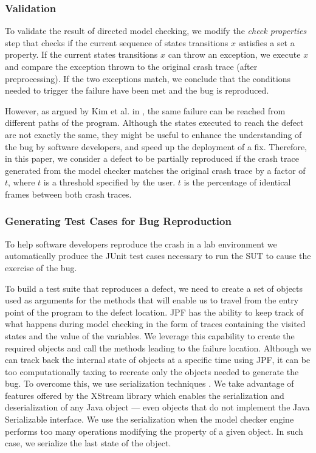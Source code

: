 \subsubsection{Validation}

To validate the result of directed model checking, we modify
the {\it check properties} step that checks if the current sequence
of states transitions $x$ satisfies a set a property. If the current
states transitions $x$ can throw an exception, we execute $x$ and
compare the exception thrown to the original crash trace (after
preprocessing). If the two exceptions match, we conclude that
the conditions needed to trigger the failure have been met and
the bug is reproduced.

However, as argued by Kim et al. in \cite{Kim2013b}, the same failure can
be reached from different paths of the program. Although the
states executed to reach the defect are not exactly the same,
they might be useful to enhance the understanding of the bug
by software developers, and speed up the deployment of a fix.
Therefore, in this paper, we consider a defect to be partially
reproduced if the crash trace generated from the model
checker matches the original crash trace by a factor of $t$, where
$t$ is a threshold specified by the user. $t$ is the percentage of
identical frames between both crash traces.

\subsubsection{Generating Test Cases for Bug Reproduction}

To help software developers reproduce the crash in a lab
environment we automatically produce the JUnit test cases
necessary to run the SUT to cause the exercise of the bug.

To build a test suite that reproduces a defect, we need to create
a set of objects used as arguments for the methods that will
enable us to travel from the entry point of the program to the
defect location. JPF has the ability to keep track of what
happens during model checking in the form of traces
containing the visited states and the value of the variables. We
leverage this capability to create the required objects and call
the methods leading to the failure location. Although we can
track back the internal state of objects at a specific time using
JPF, it can be too computationally taxing to recreate only the
objects needed to generate the bug. To overcome this, we use
serialization techniques \cite{Opyrchal1999}. We take advantage of features
offered by the XStream \cite{Xstream2011} library which enables the
serialization and deserialization of any Java object — even
objects that do not implement the Java Serializable interface.
We use the serialization when the model checker engine
performs too many operations modifying the property of a
given object. In such case, we serialize the last state of the
object.

